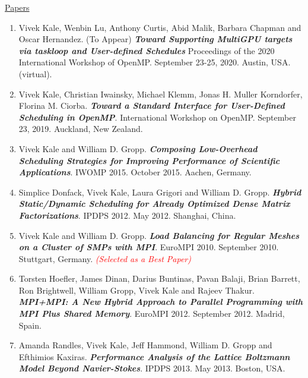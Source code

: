 




\underline{Papers}
\begin{enumerate}
\item Vivek Kale, Wenbin Lu, Anthony Curtis, Abid Malik, Barbara Chapman and Oscar Hernandez. (To Appear) \textbf{\textit{Toward Supporting MultiGPU targets via taskloop and User-defined Schedules}} Proceedings of the 2020 International Workshop of OpenMP. September 23-25, 2020. Austin, USA. (virtual). 
\item Vivek Kale, Christian Iwainsky, Michael Klemm, Jonas H. Muller Korndorfer, Florina M. Ciorba. \textbf{\textit{Toward a Standard Interface for User-Defined Scheduling in OpenMP}}. International Workshop on OpenMP. September 23, 2019. Auckland, New Zealand. 
\item Vivek Kale and William D. Gropp. \textbf{\textit{Composing Low-Overhead Scheduling Strategies for Improving Performance of Scientific Applications}}. IWOMP 2015. October 2015. Aachen, Germany.
\item Simplice Donfack, Vivek Kale, Laura Grigori and William D. Gropp. \textbf{\textit{Hybrid Static/Dynamic Scheduling for Already Optimized Dense Matrix Factorizations}}. IPDPS 2012. May 2012. Shanghai, China.
\item Vivek Kale and William D. Gropp. \textbf{\textit{Load Balancing for Regular Meshes on a Cluster of SMPs with MPI}}. EuroMPI 2010. September 2010. Stuttgart, Germany. \textit{\textcolor{red}{(Selected as a Best Paper)}}
\item Torsten Hoefler, James Dinan, Darius Buntinas, Pavan Balaji, Brian Barrett, Ron Brightwell, William Gropp, Vivek Kale and Rajeev Thakur. \textbf{\textit{MPI+MPI: A New Hybrid Approach to Parallel Programming with MPI Plus Shared Memory}}. EuroMPI 2012. September 2012. Madrid, Spain.
\item Amanda Randles, Vivek Kale, Jeff Hammond, William D. Gropp and Efthimios Kaxiras. \textbf{\textit{Performance Analysis of the Lattice
Boltzmann Model Beyond Navier-Stokes}}. IPDPS 2013. May 2013. Boston, USA.
\end{enumerate} 

